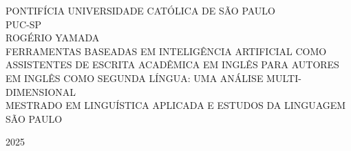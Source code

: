 \begin{titlepage}
    \begin{center}
        {\large \MakeUppercase{Pontifícia Universidade Católica de São Paulo}}\\
        {\large \MakeUppercase{PUC-SP}}\\
        \vspace{5cm}
        {\large \MakeUppercase{Rogério Yamada}}\\
        \vspace{5cm}
        {\Large \MakeUppercase{Ferramentas Baseadas em Inteligência Artificial como Assistentes de Escrita Acadêmica em Inglês para Autores em Inglês como Segunda Língua: Uma Análise Multi-Dimensional}}\\
        \vspace{5cm}
        {\large \MakeUppercase{Mestrado em Linguística Aplicada e Estudos da Linguagem}}
        \vfill
        {\large \MakeUppercase{São Paulo}}
        
        {\large 2025}
    \end{center}
\end{titlepage}

